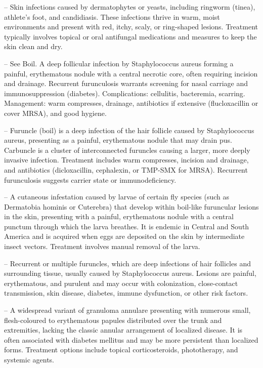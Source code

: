 -- Skin infections caused by dermatophytes or yeasts, including ringworm (tinea), athlete's foot, and candidiasis. These infections thrive in warm, moist environments and present with red, itchy, scaly, or ring-shaped lesions. Treatment typically involves topical or oral antifungal medications and measures to keep the skin clean and dry.

-- See Boil. A deep follicular infection by Staphylococcus aureus forming a painful, erythematous nodule with a central necrotic core, often requiring incision and drainage. Recurrent furunculosis warrants screening for nasal carriage and immunosuppression (diabetes). Complications: cellulitis, bacteremia, scarring. Management: warm compresses, drainage, antibiotics if extensive (flucloxacillin or cover MRSA), and good hygiene.

-- Furuncle (boil) is a deep infection of the hair follicle caused by Staphylococcus aureus, presenting as a painful, erythematous nodule that may drain pus. Carbuncle is a cluster of interconnected furuncles causing a larger, more deeply invasive infection. Treatment includes warm compresses, incision and drainage, and antibiotics (dicloxacillin, cephalexin, or TMP-SMX for MRSA). Recurrent furunculosis suggests carrier state or immunodeficiency.

-- A cutaneous infestation caused by larvae of certain fly species (such as Dermatobia hominis or Cuterebra) that develop within boil-like furuncular lesions in the skin, presenting with a painful, erythematous nodule with a central punctum through which the larva breathes. It is endemic in Central and South America and is acquired when eggs are deposited on the skin by intermediate insect vectors. Treatment involves manual removal of the larva.

-- Recurrent or multiple furuncles, which are deep infections of hair follicles and surrounding tissue, usually caused by Staphylococcus aureus. Lesions are painful, erythematous, and purulent and may occur with colonization, close-contact transmission, skin disease, diabetes, immune dysfunction, or other risk factors.

-- A widespread variant of granuloma annulare presenting with numerous small, flesh-coloured to erythematous papules distributed over the trunk and extremities, lacking the classic annular arrangement of localized disease. It is often associated with diabetes mellitus and may be more persistent than localized forms. Treatment options include topical corticosteroids, phototherapy, and systemic agents.

